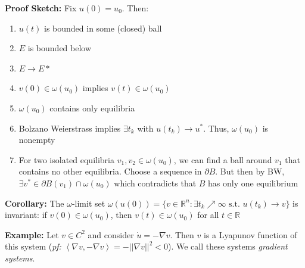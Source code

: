 \documentclass[12pt]{report}
\newcommand{\R}{\mathbb{R}}
\newcommand{\brak}[1]{\left\langle #1 \right\rangle}
\newcommand{\abs}[1]{\left\vert #1 \right\vert}
\newcommand{\st}{\text{ s.t. }}
\newcommand*{\tbf}[1]{\ifmmode\mathbf{#1}\else\textbf{#1}\fi}
\newenvironment{proposition}[1][gray]{
\begin{tcolorbox}[
    parbox=false,
    colback=#1!5!white,
    colframe=#1!75!black,
    breakable
]}
{\end{tcolorbox}}
\begin{document}
\begin{proposition}
    \textbf{Proof Sketch:} Fix $u(0) = u_0$. Then:
    \begin{enumerate}
        \item $u(t)$ is bounded in some (closed) ball
        \item $E$ is bounded below
        \item $E \to E*$
        \item $v(0) \in \omega(u_0)$ implies $v(t) \in \omega(u_0)$
        \item $\omega(u_0)$ contains only equilibria
        \item Bolzano Weierstrass implies $\exists t_k$ with $u(t_k) \to u^*$. Thus, $\omega(u_0)$ is nonempty
        \item For two isolated equilibria $v_1, v_2 \in \omega(u_0)$, we can find a ball around $v_1$ that contains no other equilibria. Choose a sequence in $\partial B$. But then by BW, $\exists v^* \in \partial B(v_1) \cap \omega(u_0)$ which contradicts that $B$ has only one equilibrium
    \end{enumerate}
\end{proposition}

\begin{proposition}
    \textbf{Corollary:} The $\omega$-limit set $\omega(u(0)) = \{v \in \R^n: \exists t_k \nearrow \infty \st u(t_k) \to v\}$ is invariant: if $v(0) \in \omega(u_0)$, then $v(t) \in \omega(u_0)$ for all $t \in \R$
\end{proposition}

\tbf{Example:} Let $v \in C^2$ and consider $\dot u = -\nabla v$. Then $v$ is a Lyapunov function of this system (\emph{pf:} $\brak{\nabla v, -\nabla v} = -\abs{\abs{\nabla v}}^2 < 0$). We call these systems \emph{gradient systems}.

\begin{center}
\end{center}
\end{document}
